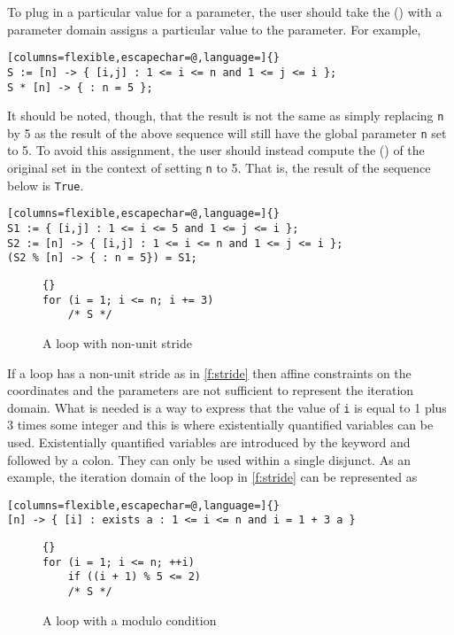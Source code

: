 To plug in a particular value for a parameter, the user should
take the  (\ai[\tt]{*}) with a parameter domain
assigns a particular value to the parameter.
For example,
\begin{lstlisting}[columns=flexible,escapechar=@,language=]{}
S := [n] -> { [i,j] : 1 <= i <= n and 1 <= j <= i };
S * [n] -> { : n = 5 };
\end{lstlisting}
It should be noted, though, that the result is not the same
as simply replacing \lstinline{n} by 5 as the result of the above
sequence will still have the global parameter \lstinline{n} set to 5.
To avoid this assignment, the user should instead compute
the  (\ai[\tt]{\%}) of the original set in the context
of setting \lstinline{n} to 5.
That is, the result of the sequence below is \lstinline{True}.
\begin{lstlisting}[columns=flexible,escapechar=@,language=]{}
S1 := { [i,j] : 1 <= i <= 5 and 1 <= j <= i };
S2 := [n] -> { [i,j] : 1 <= i <= n and 1 <= j <= i };
(S2 % [n] -> { : n = 5}) = S1;
\end{lstlisting}

\begin{figure}
\begin{lstlisting}[escapechar=@]{}
for (i = 1; i <= n; i += 3)
    /* S */
\end{lstlisting}
\caption{A loop with non-unit stride}
\label{f:stride}
\end{figure}

If a loop has a non-unit stride as in \autoref{f:stride}
then affine constraints on the coordinates and the parameters
are not sufficient to represent the iteration domain.
What is needed is a way to express that the value of
\lstinline{i} is equal to 1 plus 3 times some integer and
this is where existentially quantified variables can be used.
Existentially quantified variables are introduced by the
 keyword and followed by a colon.
They can only be used within a single disjunct.
As an example, the iteration domain of the loop in \autoref{f:stride}
can be represented as
\begin{lstlisting}[columns=flexible,escapechar=@,language=]{}
[n] -> { [i] : exists a : 1 <= i <= n and i = 1 + 3 a }
\end{lstlisting}

\begin{figure}
\begin{lstlisting}[escapechar=@]{}
for (i = 1; i <= n; ++i)
    if ((i + 1) % 5 <= 2)
	/* S */
\end{lstlisting}
\caption{A loop with a modulo condition}
\label{f:modulo}
\end{figure}

